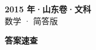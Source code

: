 \documentclass[zihao=-4, a4paper]{ctexart}
\begin{document}
\begin{center}
  {\Large\bfseries 2015 年·山东卷·文科}\\[4pt]
  {\large 数学 · 简答版}
\end{center}
\medskip
{}

\clearpage
{}
\begin{center}{\Large\bfseries 答案速查}\end{center}
\medskip

\end{document}

